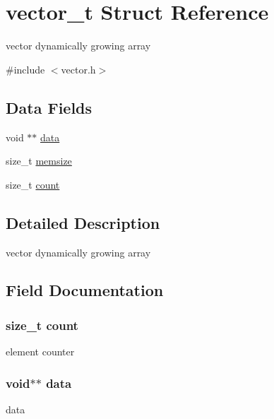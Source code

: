 \hypertarget{structvector__t}{}\section{vector\+\_\+t Struct Reference}
\label{structvector__t}


vector dynamically growing array  




{\ttfamily \#include $<$vector.\+h$>$}

\subsection*{Data Fields}
\begin{DoxyCompactItemize}
\item 
void $\ast$$\ast$ \hyperlink{structvector__t_af00cdd742d205932a8309628d39efd5e}{data}
\item 
size\+\_\+t \hyperlink{structvector__t_a1fd8d6cf6c295e3ba28941c0f63894a8}{memsize}
\item 
size\+\_\+t \hyperlink{structvector__t_a76d971a3c552bc58ba9f0d5fceae9806}{count}
\end{DoxyCompactItemize}


\subsection{Detailed Description}
vector dynamically growing array 

\subsection{Field Documentation}
\subsubsection[{\texorpdfstring{count}{count}}]{\setlength{\rightskip}{0pt plus 5cm}size\+\_\+t count}\hypertarget{structvector__t_a76d971a3c552bc58ba9f0d5fceae9806}{}\label{structvector__t_a76d971a3c552bc58ba9f0d5fceae9806}
element counter 
\subsubsection[{\texorpdfstring{data}{data}}]{\setlength{\rightskip}{0pt plus 5cm}void$\ast$$\ast$ data}\hypertarget{structvector__t_af00cdd742d205932a8309628d39efd5e}{}\label{structvector__t_af00cdd742d205932a8309628d39efd5e}
data 
